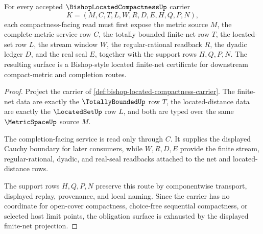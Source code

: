 \begin{theorem}
\label{thm:bishop-located-compactness-net-obligations}
For every accepted $\BishopLocatedCompactnessUp$ carrier
$$
K=(M,C,T,L,W,R,D,E,H,Q,P,N),
$$
each compactness-facing read must first expose the metric source $M$, the complete-metric service row $C$, the totally bounded finite-net row $T$, the located-set row $L$, the stream window $W$, the regular-rational readback $R$, the dyadic ledger $D$, and the real seal $E$, together with the support rows $H,Q,P,N$. The resulting surface is a Bishop-style located finite-net certificate for downstream compact-metric and completion routes.
\end{theorem}
\begin{proof}
Project the carrier of \autoref{def:bishop-located-compactness-carrier}. The finite-net data are exactly the $\TotallyBoundedUp$ row $T$, the located-distance data are exactly the $\LocatedSetUp$ row $L$, and both are typed over the same $\MetricSpaceUp$ source $M$.

The completion-facing service is read only through $C$. It supplies the displayed Cauchy boundary for later consumers, while $W,R,D,E$ provide the finite stream, regular-rational, dyadic, and real-seal readbacks attached to the net and located-distance rows.

The support rows $H,Q,P,N$ preserve this route by componentwise transport, displayed replay, provenance, and local naming. Since the carrier has no coordinate for open-cover compactness, choice-free sequential compactness, or selected host limit points, the obligation surface is exhausted by the displayed finite-net projection.
\end{proof}



